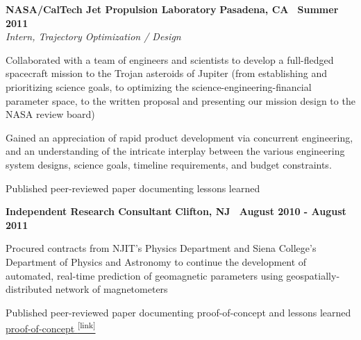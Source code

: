 \documentclass[10pt]{article}
\newcommand{\leftandright}[2]{\noindent\textbf{#1}\hfill
\textbf{#2}}
\begin{document}
\leftandright{NASA/CalTech Jet Propulsion Laboratory}{Pasadena, CA \textbullet\, Summer 2011}\\  
\vspace{-0.8em}
\textit{Intern, Trajectory Optimization / Design} 
\begin{itemize*}
  \item
    Collaborated with a team of engineers and scientists to develop a full-fledged spacecraft mission to
    the Trojan asteroids of Jupiter
    (from %
    establishing and prioritizing science goals, to optimizing the science-engineering-financial
    parameter space, to the written proposal and presenting our mission design to the NASA review
    board)
  \item 
    Gained an appreciation of rapid product development via concurrent
    engineering, and an understanding of the intricate interplay between the
    various engineering system designs, science goals, timeline
    requirements, and budget constraints.
  \item Published peer-reviewed paper documenting lessons learned

\end{itemize*}
   
\leftandright{Independent Research Consultant}{Clifton, NJ \textbullet\, 
August 2010 - August 2011} \par
\vspace{-0.8em}
\begin{itemize*}
  \item Procured contracts from NJIT's Physics Department and Siena
    College's Department of Physics and Astronomy to 
    continue the development of automated, real-time prediction of geomagnetic parameters
    using geospatially-distributed network of magnetometers
  \item Published peer-reviewed paper documenting proof-of-concept and 
    lessons learned
    \href{http://onlinelibrary.wiley.com/doi/10.1029/2011SW000688/full}
    {proof-of-concept \textsuperscript{\tiny{[link]}}}
\end{itemize*}   
\end{document}
